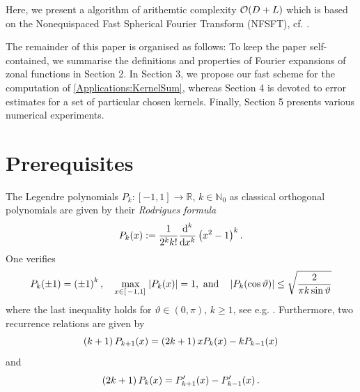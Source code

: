 \documentclass[11pt,a4paper,twoside,bibtotoc]{scrartcl}
\theoremstyle{plain}
\theoremstyle{definition}
\theoremstyle{remark}
\newcommand{\N}{\ensuremath{\mathbb{N}}}
\newcommand{\R}{\ensuremath{\mathbb{R}}}
\newcommand{\abs}[1]{\ensuremath{\left\vert#1\right\vert}}
\newcommand{\interv}[4]{\ensuremath{\left#1\left.#2,#3\right#4\right.}}
\newcommand{\fun}[2]{\ensuremath{#1{\hspace{-0.4ex}}\left(#2\right)}}
\newcommand{\paren}[1]{\ensuremath{\left(#1\right)}}
\newcommand{\dx}{\text{\rm{d}}}
\numberwithin{equation}{section}
\numberwithin{table}{section}
\numberwithin{figure}{section}
\begin{document}
Here, we present a algorithm of arithemtic complexity ${\cal O} (D+L)$ which
is based on the Nonequispaced Fast Spherical Fourier Transform (NFSFT),
cf. \cite{XXX}. 

The remainder of this paper is organised as follows:
To keep the paper self-contained, we summarise the definitions and properties
of Fourier expansions of zonal functions in Section 2.
In Section 3, we propose our fast scheme for the computation of
\eqref{Applications:KernelSum}, whereas Section 4 is devoted to error
estimates for a set of particular chosen kernels.
Finally, Section 5 presents various numerical experiments.

\section{Prerequisites} \label{sect:2}

The Legendre polynomials $P_k : \interv{[}{-1}{1}{]} \rightarrow \R$, $k \in
\N_{0}$ as classical orthogonal polynomials are given by their
\emph{Rodrigues formula} 
\[
\fun{P_k}{x} := \frac{1}{2^k k!} \frac{\dx^k}{\dx x^k} \paren{x^2-1}^k.
\]
One verifies
\begin{equation}\label{leg_prop}
\fun{P_{k}}{\pm1} = \paren{\pm1}^{k}, \quad
\max_{x \in \interv{[}{-1}{1}{]}} \abs{\fun{P_{k}}{x}} = 1,\text{ and} \quad
\left|\fun{P_{k}}{\cos\vartheta}\right| \le \sqrt{\frac{2}{\pi k
    \sin\vartheta}}
\end{equation}
where the last inequality holds for $\vartheta \in (0,\pi)$, $k \ge 1$, see
e.g. \cite[pp. 47]{niuv}.
Furthermore, two recurrence relations are given by
\begin{equation}\label{three1}
\paren{k+1}\fun{P_{k+1}}{x} = \paren{2k+1}x\fun{P_{k}}{x} - k\fun{P_{k-1}}{x}
\end{equation}
and
\begin{equation}\label{three2}
\paren{2k+1} \fun{P_{k}}{x} = \fun{P_{k+1}'}{x} - \fun{P_{k-1}'}{x}.
\end{equation}
\end{document}
